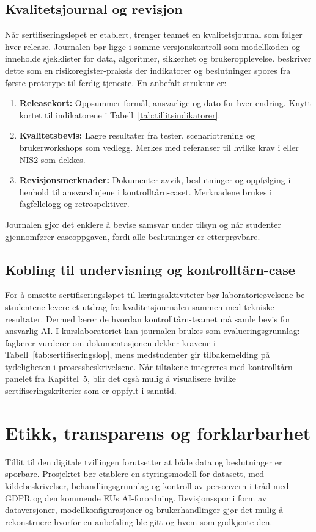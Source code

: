 \subsection{Kvalitetsjournal og revisjon}
Når sertifiseringsløpet er etablert, trenger teamet en kvalitetsjournal som følger hver release. Journalen bør ligge i samme versjonskontroll som modellkoden og inneholde sjekklister for data, algoritmer, sikkerhet og brukeropplevelse. \citet{nist2023airmf} beskriver dette som en risikoregister-praksis der indikatorer og beslutninger spores fra første prototype til ferdig tjeneste. En anbefalt struktur er:
\begin{enumerate}
    \item \textbf{Releasekort:} Oppsummer formål, ansvarlige og dato for hver endring. Knytt kortet til indikatorene i Tabell~\ref{tab:tillitsindikatorer}.
    \item \textbf{Kvalitetsbevis:} Lagre resultater fra tester, scenariotrening og brukerworkshops som vedlegg. Merkes med referanser til hvilke krav i \citet{iso2020tr24028} eller NIS2 som dekkes.
    \item \textbf{Revisjonsmerknader:} Dokumenter avvik, beslutninger og oppfølging i henhold til ansvarslinjene i kontrolltårn-caset. Merknadene brukes i fagfellelogg og retrospektiver.
\end{enumerate}
Journalen gjør det enklere å bevise samsvar under tilsyn og når studenter gjennomfører caseoppgaven, fordi alle beslutninger er etterprøvbare.

\subsection{Kobling til undervisning og kontrolltårn-case}
For å omsette sertifiseringsløpet til læringsaktiviteter bør laboratorieøvelsene be studentene levere et utdrag fra kvalitetsjournalen sammen med tekniske resultater. Dermed lærer de hvordan kontrolltårn-teamet må samle bevis for ansvarlig AI. I kurslaboratoriet kan journalen brukes som evalueringsgrunnlag: faglærer vurderer om dokumentasjonen dekker kravene i Tabell~\ref{tab:sertifiseringslop}, mens medstudenter gir tilbakemelding på tydeligheten i prosessbeskrivelsene. Når tiltakene integreres med kontrolltårn-panelet fra Kapittel~5, blir det også mulig å visualisere hvilke sertifiseringskriterier som er oppfylt i sanntid.

\section{Etikk, transparens og forklarbarhet}
Tillit til den digitale tvillingen forutsetter at både data og beslutninger er sporbare. Prosjektet bør etablere en styringsmodell for datasett, med kildebeskrivelser, behandlingsgrunnlag og kontroll av personvern i tråd med GDPR og den kommende EUs AI-forordning. Revisjonsspor i form av dataversjoner, modellkonfigurasjoner og brukerhandlinger gjør det mulig å rekonstruere hvorfor en anbefaling ble gitt og hvem som godkjente den.

